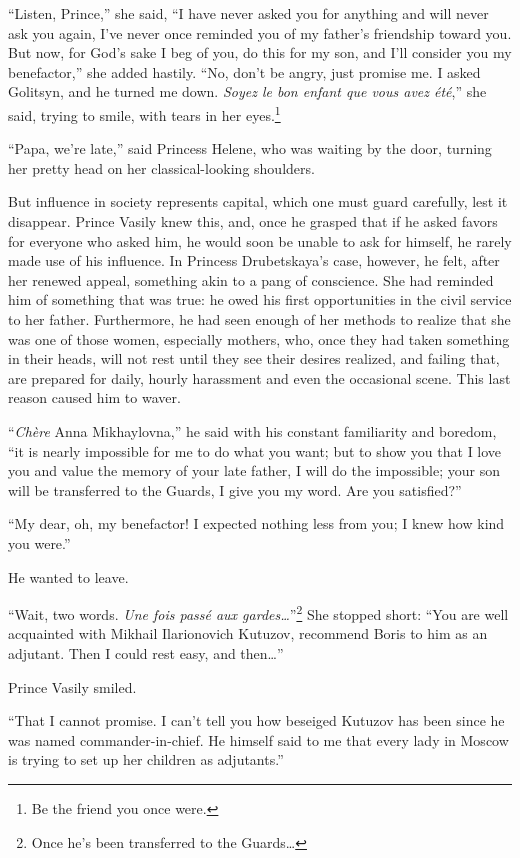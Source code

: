 ``Listen, Prince,'' she said, ``I have never asked you for anything
and will never ask you again, I've never once reminded you of my
father's friendship toward you. But now, for God's sake I beg of you,
do this for my son, and I'll consider you my benefactor,'' she added
hastily. ``No, don't be angry, just promise me. I asked Golitsyn, and
he turned me down. \textit{Soyez le bon enfant que vous avez
  \'et\'e},'' she said, trying to smile, with tears in her
eyes.\footnote{Be the friend you once were.}

``Papa, we're late,'' said Princess Helene, who was waiting by the
door, turning her pretty head on her classical-looking shoulders.

But influence in society represents capital, which one must guard
carefully, lest it disappear. Prince Vasily knew this, and, once he
grasped that if he asked favors for everyone who asked him, he would
soon be unable to ask for himself, he rarely made use of his
influence. In Princess Drubetskaya's case, however, he felt, after her
renewed appeal, something akin to a pang of conscience. She had
reminded him of something that was true: he owed his first
opportunities in the civil service to her father. Furthermore, he had
seen enough of her methods to realize that she was one of those women,
especially mothers, who, once they had taken something in their heads,
will not rest until they see their desires realized, and failing that,
are prepared for daily, hourly harassment and even the occasional
scene. This last reason caused him to waver.

``\textit{Ch\`ere} Anna Mikhaylovna,'' he said with his constant
familiarity and boredom, ``it is nearly impossible for me to do what
you want; but to show you that I love you and value the memory of your
late father, I will do the impossible; your son will be transferred to
the Guards, I give you my word. Are you satisfied?''

``My dear, oh, my benefactor! I expected nothing less from you; I knew
how kind you were.''

He wanted to leave.

``Wait, two words. \textit{Une fois pass\'e aux
  gardes\ldots{}}''\footnote{Once he's been transferred to the
  Guards\ldots{}} She stopped short: ``You are well acquainted with
Mikhail Ilarionovich Kutuzov, recommend Boris to him as an
adjutant. Then I could rest easy, and then\ldots{}''

Prince Vasily smiled.

``That I cannot promise. I can't tell you how beseiged Kutuzov has
been since he was named commander-in-chief. He himself said to me that
every lady in Moscow is trying to set up her children as adjutants.''

